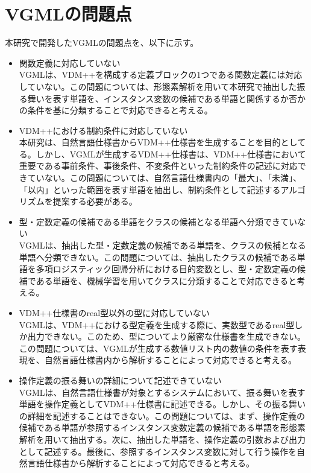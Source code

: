 \section{VGMLの問題点}
本研究で開発したVGMLの問題点を、以下に示す。

\begin{itemize}
	\item 関数定義に対応していない\\VGMLは、VDM++を構成する定義ブロックの1つである関数定義には対応していない。この問題については、形態素解析を用いて本研究で抽出した振る舞いを表す単語を、インスタンス変数の候補である単語と関係するか否かの条件を基に分類することで対応できると考える。
	\item VDM++における制約条件に対応していない\\本研究は、自然言語仕様書からVDM++仕様書を生成することを目的としてる。しかし、VGMLが生成するVDM++仕様書は、VDM++仕様書において重要である事前条件、事後条件、不変条件といった制約条件の記述に対応できていない。この問題については、自然言語仕様書内の「最大」、「未満」、「以内」といった範囲を表す単語を抽出し、制約条件として記述するアルゴリズムを提案する必要がある。
	\item 型・定数定義の候補である単語をクラスの候補となる単語へ分類できていない\\VGMLは、抽出した型・定数定義の候補である単語を、クラスの候補となる単語へ分類できない。この問題については、抽出したクラスの候補である単語を多項ロジスティック回帰分析における目的変数とし、型・定数定義の候補である単語を、機械学習を用いてクラスに分類することで対応できると考える。
	\item VDM++仕様書のreal型以外の型に対応していない\\VGMLは、VDM++における型定義を生成する際に、実数型であるreal型しか出力できない。このため、型についてより厳密な仕様書を生成できない。この問題については、VGMLが生成する数値リスト内の数値の条件を表す表現を、自然言語仕様書内から解析することによって対応できると考える。
	\item 操作定義の振る舞いの詳細について記述できていない\\VGMLは、自然言語仕様書が対象とするシステムにおいて、振る舞いを表す単語を操作定義としてVDM++仕様書に記述できる。しかし、その振る舞いの詳細を記述することはできない。この問題については、まず、操作定義の候補である単語が参照するインスタンス変数定義の候補である単語を形態素解析を用いて抽出する。次に、抽出した単語を、操作定義の引数および出力として記述する。最後に、参照するインスタンス変数に対して行う操作を自然言語仕様書から解析することによって対応できると考える。
\end{itemize}

